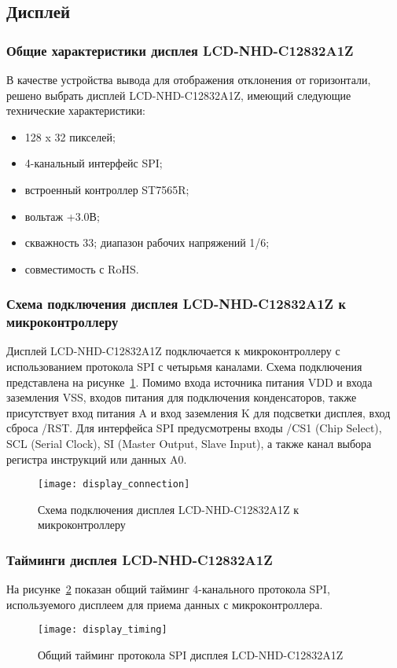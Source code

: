 \documentclass[document.tex]{subfiles}
\begin{document}
\clearpage
\subsection{Дисплей}
\subsubsection{Общие характеристики дисплея LCD-NHD-C12832A1Z}
В качестве устройства вывода для отображения отклонения от горизонтали, решено выбрать дисплей LCD-NHD-C12832A1Z, имеющий следующие технические характеристики:
\begin{itemize}
	\item 128 x 32 пикселей;
	\item 4-канальный интерфейс SPI;
	\item встроенный контроллер ST7565R;
	\item вольтаж +3.0В;
	\item скважность 33; диапазон рабочих напряжений 1/6;
	\item совместимость с RoHS.\cite{display}
\end{itemize}
\subsubsection{Схема подключения дисплея LCD-NHD-C12832A1Z к микроконтроллеру}
Дисплей LCD-NHD-C12832A1Z подключается к микроконтроллеру с использованием про\-токола SPI с четырьмя каналами. Схема подключения представлена на
рисунке~\ref{fig:display_connection}. Помимо входа источника питания VDD и входа заземления VSS, входов питания для подключения конденсаторов, также присутствует вход питания A и
вход заземления K для подсветки дисплея, вход сброса /RST. Для интерфейса SPI предусмотрены входы /CS1 (Chip Select), SCL (Serial Clock), SI (Master Output, Slave Input), а также
канал выбора регистра инструкций или данных A0.\cite{display, lcd_interfaces}

\begin{figure}[here]
\centering
\texttt{[image: display\_connection]}
\caption{Схема подключения дисплея LCD-NHD-C12832A1Z к микроконтроллеру}
\label{fig:display_connection}
\end{figure}

\clearpage
\subsubsection{Тайминги дисплея LCD-NHD-C12832A1Z}
На рисунке~\ref{fig:display_timing} показан общий тайминг 4-канального протокола SPI, используемого дисплеем для приема данных с микроконтроллера.
\begin{figure}[here]
\centering
\texttt{[image: display\_timing]}
\caption{Общий тайминг протокола SPI дисплея LCD-NHD-C12832A1Z}
\label{fig:display_timing}
\end{figure}
\end{document}
